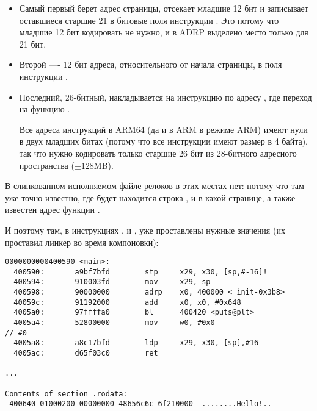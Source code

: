 \begin{itemize}
\item 
Самый первый берет адрес страницы, отсекает младшие 12 бит и записывает оставшиеся старшие 21
в битовые поля инструкции . Это потому что младшие 12 бит кодировать не нужно,
и в ADRP выделено место только для 21 бит.

\item Второй ---- 12 бит адреса, относительного от начала страницы, в поля инструкции \ADD.

\item Последний, 26-битный, накладывается на инструкцию по адресу , где переход на функцию \printf.

Все адреса инструкций в ARM64 (да и в ARM в режиме ARM) имеют нули в двух младших битах
(потому что все инструкции имеют размер в 4 байта),
так что нужно кодировать только старшие 26 бит из 28-битного адресного пространства ($\pm 128$MB).

\end{itemize}

В слинкованном исполняемом файле релоков в этих местах нет: потому что там уже точно известно, 
где будет находится строка , и в какой странице, а также известен адрес функции \puts.

И поэтому там, в инструкциях , \ADD и , уже проставлены нужные значения 
(их проставил линкер во время компоновки):

\begin{lstlisting}[caption=objdump исполняемого файла,style=customasmARM]
0000000000400590 <main>:
  400590:       a9bf7bfd        stp     x29, x30, [sp,#-16]!
  400594:       910003fd        mov     x29, sp
  400598:       90000000        adrp    x0, 400000 <_init-0x3b8>
  40059c:       91192000        add     x0, x0, #0x648
  4005a0:       97ffffa0        bl      400420 <puts@plt>
  4005a4:       52800000        mov     w0, #0x0                        // #0
  4005a8:       a8c17bfd        ldp     x29, x30, [sp],#16
  4005ac:       d65f03c0        ret

...

Contents of section .rodata:
 400640 01000200 00000000 48656c6c 6f210000  ........Hello!..
\end{lstlisting}


